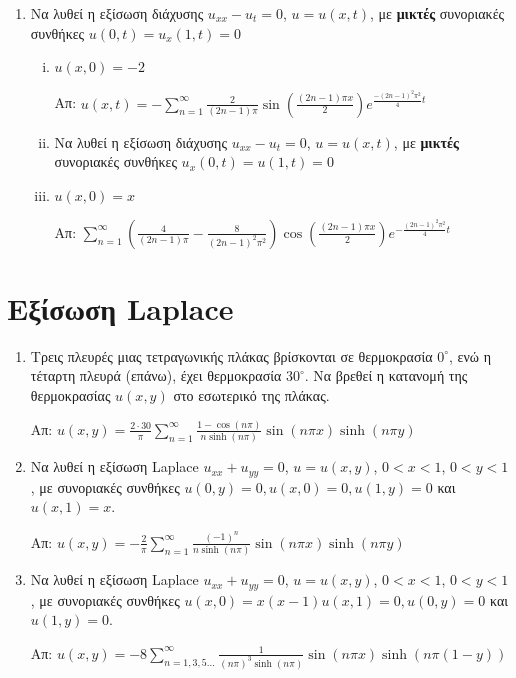 \documentclass[a4paper,table]{report}
\begin{document}
\begin{enumerate}
	\item Να λυθεί η εξίσωση διάχυσης $ u_{xx} - u_t = 0 $, $ u=u(x,t) $, με \textbf{μικτές} συνοριακές συνθήκες $ u(0,t) = u_x(1,t) = 0 $ 

		\begin{enumerate}[(i)]
			\item $ u(x,0) = -2 $

				\hfill Απ: $ u(x,t) = -\sum_{n=1}^{\infty} \frac{ 2 }{ (2n-1)\pi } \sin{\left(\frac{
				(2n-1) \pi x }{ 2 }\right)} e^{\frac{-(2n-1)^{2}\pi^{2}}{4}t} $

	\item Να λυθεί η εξίσωση διάχυσης $ u_{xx} - u_t = 0 $, $ u=u(x,t) $, με \textbf{μικτές}
		συνοριακές συνθήκες $ u_x(0,t) = u(1,t) = 0 $ 

			\item $ u(x,0) = x $

				\hfill Απ: $ \sum_{n=1}^{\infty} (\frac{ 4 }{ (2n-1) \pi } - \frac{ 8 }{ (2n-1)^{2}
				\pi ^{2}}) \cos{(\frac{ (2n-1) \pi x }{ 2 })} e^{- \frac{ (2n-1)^{2} \pi ^2 }{ 4 } t} $


		\end{enumerate}



\end{enumerate}


\section{Εξίσωση \textlatin{Laplace}}

\begin{enumerate}

	\item Τρεις πλευρές μιας τετραγωνικής πλάκας βρίσκονται σε θερμοκρασία $ 0^{\circ} $, ενώ η
		τέταρτη πλευρά (επάνω), έχει θερμοκρασία $ 30^{\circ} $. Να βρεθεί η κατανομή της
		θερμοκρασίας $ u(x,y) $ στο εσωτερικό της πλάκας. 

		\hfill Απ: $u(x,y) = \frac{2\cdot 30}{\pi} \sum_{n=1}^{\infty} \frac{ 1 - \cos{(n\pi)} }{ n 
		\sinh{(n\pi)}}	\sin{(n\pi x)}\sinh{(n\pi y)} $

\item Να λυθεί η εξίσωση \textlatin{Laplace} $ u_{xx} + u_{yy} = 0 $, $u=u(x,y)$, $ 0<x<1 $, $ 0<y<1
	$, με συνοριακές συνθήκες $ u(0,y) = 0, u(x,0) = 0, u(1,y) = 0 $ και $ u(x,1) = x $. 


\hfill Απ: $ u(x,y) = - \frac{ 2 }{ \pi } \sum_{n=1}^{\infty}  \frac{ (-1)^{n} }{ n
		\sinh{(n\pi)} } \sin{(n\pi x)} \sinh{(n\pi y)}  $

\item Να λυθεί η εξίσωση \textlatin{Laplace} $ u_{xx} + u_{yy} = 0 $, $u=u(x,y)$, $ 0<x<1 $, $ 0<y<1
	$, με συνοριακές συνθήκες $ u(x,0) = x(x-1)  u(x,1) = 0, u(0,y) = 0 $ και $ u(1,y) = 0 $. 
	
	\hfill Απ: $ u(x,y) = - 8 \sum_{n=1,3,5\ldots}^{\infty}  \frac{ 1} { (n\pi)^{3} \sinh{(n\pi)}
	} \sin{(n\pi x)} \sinh{(n \pi (1-y))} $
\end{enumerate}
\end{document}

